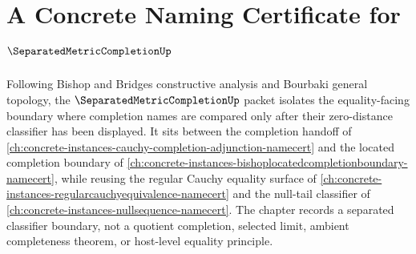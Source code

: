 \chapter{A Concrete Naming Certificate for $\SeparatedMetricCompletionUp$}
\label{ch:concrete-instances-separated-metric-completion-namecert}

Following Bishop and Bridges constructive analysis and Bourbaki general topology, the $\SeparatedMetricCompletionUp$ packet isolates the equality-facing boundary where completion names are compared only after their zero-distance classifier has been displayed. It sits between the completion handoff of \autoref{ch:concrete-instances-cauchy-completion-adjunction-namecert} and the located completion boundary of \autoref{ch:concrete-instances-bishoplocatedcompletionboundary-namecert}, while reusing the regular Cauchy equality surface of \autoref{ch:concrete-instances-regularcauchyequivalence-namecert} and the null-tail classifier of \autoref{ch:concrete-instances-nullsequence-namecert}. The chapter records a separated classifier boundary, not a quotient completion, selected limit, ambient completeness theorem, or host-level equality principle.


